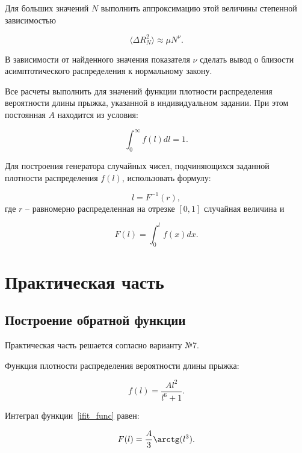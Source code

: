 \documentclass[14pt,a4paper]{extarticle}
\theoremstyle{plain}
\begin{document}
	Для больших значений $N$ выполнить аппроксимацию этой величины степенной зависимостью
	
	\begin{equation}
		\langle \Delta R_N^2 \rangle \approx \mu  N^{\nu}.
		\label{min_squares_condition}
	\end{equation}
	
	В зависимости от найденного значения показателя $\nu$ сделать вывод о близости асимптотического распределения к нормальному закону.
	
	Все расчеты выполнить для значений функции плотности распределения вероятности длины прыжка, указанной в индивидуальном задании.
	При этом постоянная $A$ находится из условия:
	
	\begin{equation}
		\int_{0}^{\infty} f(l)dl =1.
		\label{a_condition}
	\end{equation}
	
	Для построения генератора случайных чисел, подчиняющихся заданной плотности распределения $f(l)$, использовать формулу:
	
	\begin{equation}
		l = F^{-1}(r),
		\nonumber
	\end{equation}
	где $r$ – равномерно распределенная на отрезке $[0,1]$ случайная величина и
	
	\begin{equation}
		F(l) = \int_{0}^{l} f(x) dx.
		\nonumber
	\end{equation}
	
	\section{Практическая часть}
	
	\subsection{Построение обратной функции}
	
	Практическая часть решается согласно варианту №7.
	
	Функция плотности распределения вероятности длины прыжка:
	
	\begin{equation}
		f(l) = \dfrac{Al^2}{l^6+1}.
		\label{ifit_func}
	\end{equation}
	
	Интеграл функции~\eqref{ifit_func} равен:
	
	\begin{equation}
		F(l) = \dfrac{A}{3} \arctg(l^3).
		\nonumber
	\end{equation}
	
\end{document}
